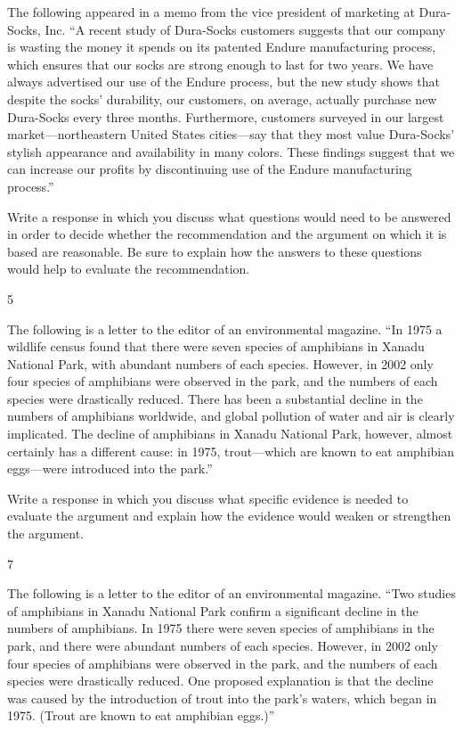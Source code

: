 \documentclass[]{article}
\begin{document}
The following appeared in a memo from the vice president of marketing at
Dura-Socks, Inc. ``A recent study of Dura-Socks customers suggests that
our company is wasting the money it spends on its patented Endure
manufacturing process, which ensures that our socks are strong enough to
last for two years. We have always advertised our use of the Endure
process, but the new study shows that despite the socks' durability, our
customers, on average, actually purchase new Dura-Socks every three
months. Furthermore, customers surveyed in our largest
market---northeastern United States cities---say that they most value
Dura-Socks' stylish appearance and availability in many colors. These
findings suggest that we can increase our profits by discontinuing use
of the Endure manufacturing process.''

Write a response in which you discuss what questions would need to be
answered in order to decide whether the recommendation and the argument
on which it is based are reasonable. Be sure to explain how the answers
to these questions would help to evaluate the recommendation.

5

The following is a letter to the editor of an environmental magazine.
``In 1975 a wildlife census found that there were seven species of
amphibians in Xanadu National Park, with abundant numbers of each
species. However, in 2002 only four species of amphibians were observed
in the park, and the numbers of each species were drastically reduced.
There has been a substantial decline in the numbers of amphibians
worldwide, and global pollution of water and air is clearly implicated.
The decline of amphibians in Xanadu National Park, however, almost
certainly has a different cause: in 1975, trout---which are known to eat
amphibian eggs---were introduced into the park.''

Write a response in which you discuss what specific evidence is needed
to evaluate the argument and explain how the evidence would weaken or
strengthen the argument.

7

The following is a letter to the editor of an environmental magazine.
``Two studies of amphibians in Xanadu National Park confirm a
significant decline in the numbers of amphibians. In 1975 there were
seven species of amphibians in the park, and there were abundant numbers
of each species. However, in 2002 only four species of amphibians were
observed in the park, and the numbers of each species were drastically
reduced. One proposed explanation is that the decline was caused by the
introduction of trout into the park's waters, which began in 1975.
(Trout are known to eat amphibian eggs.)''
\end{document}
